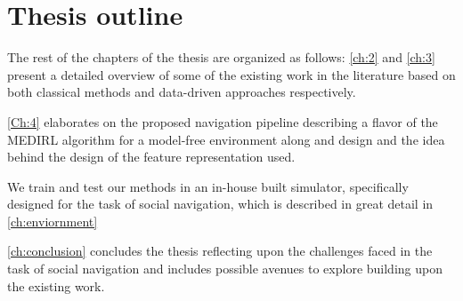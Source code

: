 
\section{Thesis outline}
The rest of the chapters of the thesis are organized as follows:
\autoref{ch:2} and \autoref{ch:3} present a detailed overview of some of the existing work in the literature based on both classical methods and data-driven approaches respectively.

\autoref{Ch:4} elaborates on the proposed navigation pipeline describing a flavor of the MEDIRL algorithm for a model-free environment along and design and the idea behind the design of the feature representation used.

We train and test our methods in an in-house built simulator, specifically designed for the task of social navigation, which is described in great detail in \autoref{ch:enviornment}


\autoref{ch:conclusion} concludes the thesis reflecting upon the challenges faced in the task of social navigation and includes possible avenues to explore building upon the existing work.
